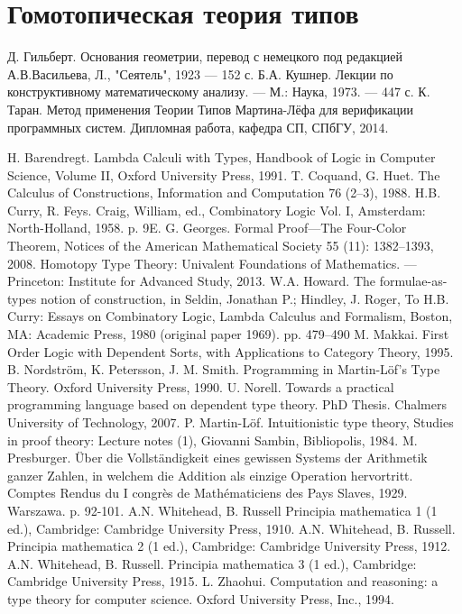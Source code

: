 \documentclass[14pt]{matmex-diploma-custom}
\begin{document}
\section{Гомотопическая теория типов}


\newpage
\begin{thebibliography}{9}
    Д. Гильберт. Основания геометрии, перевод с немецкого под редакцией А.В.Васильева,
    Л., "Сеятель", 1923 — 152 с.
    Б.А. Кушнер. Лекции по конструктивному математическому анализу. — М.: Наука, 1973. — 447 с.
    К. Таран. Метод применения Теории Типов Мартина-Лёфа для верификации программных систем.
    Дипломная работа, кафедра СП, СПбГУ, 2014.
  
    H. Barendregt. Lambda Calculi with Types, Handbook of Logic in Computer Science, Volume II, Oxford University Press, 1991.
    T. Coquand, G. Huet. The Calculus of Constructions, Information and Computation 76 (2–3), 1988.
    H.B. Curry, R. Feys. Craig, William, ed., Combinatory Logic Vol. I, Amsterdam: North-Holland, 1958. p. 9E.
    G. Georges. Formal Proof—The Four-Color Theorem, Notices of the American Mathematical Society 55 (11): 1382–1393, 2008.
    Homotopy Type Theory: Univalent Foundations of Mathematics. — Princeton: Institute for Advanced Study, 2013.
    W.A. Howard. The formulae-as-types notion of construction, in Seldin, Jonathan P.; Hindley, J. Roger, To H.B. Curry: Essays on Combinatory Logic, Lambda Calculus and Formalism, Boston, MA: Academic Press, 1980 (original paper 1969). pp. 479–490
 M. Makkai. First Order Logic with Dependent Sorts, with Applications to Category Theory, 1995.
    B. Nordström, K. Petersson, J. M. Smith. Programming in Martin-Löf's Type Theory. Oxford University Press, 1990.
    U. Norell. Towards a practical programming language based on dependent type theory. PhD Thesis. Chalmers University of Technology, 2007.
   P. Martin-Löf. Intuitionistic type theory,
    Studies in proof theory: Lecture notes (1), Giovanni Sambin, Bibliopolis, 1984.
    M. Presburger. Über die Vollständigkeit eines gewissen Systems der Arithmetik ganzer Zahlen, in welchem die Addition als einzige Operation hervortritt. Comptes Rendus du I congrès de Mathématiciens des Pays Slaves, 1929.  Warszawa. p. 92-101.
    A.N. Whitehead, B. Russell Principia mathematica 1 (1 ed.), Cambridge: Cambridge University Press, 1910.
    A.N. Whitehead, B. Russell. Principia mathematica 2 (1 ed.), Cambridge: Cambridge University Press, 1912.
    A.N. Whitehead, B. Russell. Principia mathematica 3 (1 ed.), Cambridge: Cambridge University Press, 1915.
     L. Zhaohui. Computation and reasoning: a type theory for computer science. Oxford University Press, Inc., 1994.
\end{thebibliography}
\end{document}
